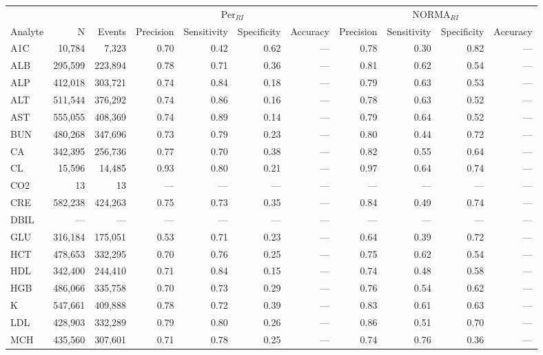 \begin{table}[ht]
\centering
\footnotesize
\begin{tabular}{lrrrrrrrrrr}
\toprule
 & &  & \multicolumn{4}{c}{Per$_{RI}$} & \multicolumn{4}{c}{NORMA$_{RI}$} \\
\cmidrule(lr){4-7} \cmidrule(lr){8-11}
Analyte & N & Events & Precision & Sensitivity & Specificity & Accuracy & Precision & Sensitivity & Specificity & Accuracy \\
\midrule
A1C & 10,784 & 7,323 & 0.70 & 0.42 & 0.62 & --- & 0.78 & 0.30 & 0.82 & --- \\
ALB & 295,599 & 223,894 & 0.78 & 0.71 & 0.36 & --- & 0.81 & 0.62 & 0.54 & --- \\
ALP & 412,018 & 303,721 & 0.74 & 0.84 & 0.18 & --- & 0.79 & 0.63 & 0.53 & --- \\
ALT & 511,544 & 376,292 & 0.74 & 0.86 & 0.16 & --- & 0.78 & 0.63 & 0.52 & --- \\
AST & 555,055 & 408,369 & 0.74 & 0.89 & 0.14 & --- & 0.79 & 0.64 & 0.52 & --- \\
BUN & 480,268 & 347,696 & 0.73 & 0.79 & 0.23 & --- & 0.80 & 0.44 & 0.72 & --- \\
CA & 342,395 & 256,736 & 0.77 & 0.70 & 0.38 & --- & 0.82 & 0.55 & 0.64 & --- \\
CL & 15,596 & 14,485 & 0.93 & 0.80 & 0.21 & --- & 0.97 & 0.64 & 0.74 & --- \\
CO2 & 13 & 13 & --- & --- & --- & --- & --- & --- & --- & --- \\
CRE & 582,238 & 424,263 & 0.75 & 0.73 & 0.35 & --- & 0.84 & 0.49 & 0.74 & --- \\
DBIL & --- & --- & --- & --- & --- & --- & --- & --- & --- & --- \\
GLU & 316,184 & 175,051 & 0.53 & 0.71 & 0.23 & --- & 0.64 & 0.39 & 0.72 & --- \\
HCT & 478,653 & 332,295 & 0.70 & 0.76 & 0.25 & --- & 0.75 & 0.62 & 0.54 & --- \\
HDL & 342,400 & 244,410 & 0.71 & 0.84 & 0.15 & --- & 0.74 & 0.48 & 0.58 & --- \\
HGB & 486,066 & 335,758 & 0.70 & 0.73 & 0.29 & --- & 0.76 & 0.54 & 0.62 & --- \\
K & 547,661 & 409,888 & 0.78 & 0.72 & 0.39 & --- & 0.83 & 0.61 & 0.63 & --- \\
LDL & 428,903 & 332,289 & 0.79 & 0.80 & 0.26 & --- & 0.86 & 0.51 & 0.70 & --- \\
MCH & 435,560 & 307,601 & 0.71 & 0.78 & 0.25 & --- & 0.74 & 0.76 & 0.36 & --- \\

\end{tabular}
\end{table}
